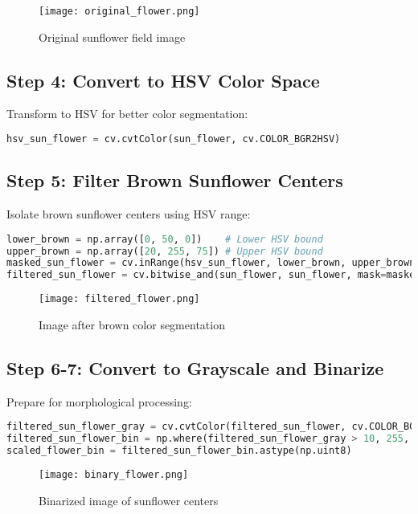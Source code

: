 \documentclass[12pt]{article}
\begin{document}
\begin{figure}[H]
    \centering
    \texttt{[image: original\_flower.png]}
    \caption{Original sunflower field image}
    \label{fig:original}
\end{figure}

\subsection{Step 4: Convert to HSV Color Space}
Transform to HSV for better color segmentation:
\begin{lstlisting}[language=Python]
hsv_sun_flower = cv.cvtColor(sun_flower, cv.COLOR_BGR2HSV)
\end{lstlisting}

\subsection{Step 5: Filter Brown Sunflower Centers}
Isolate brown sunflower centers using HSV range:
\begin{lstlisting}[language=Python]
lower_brown = np.array([0, 50, 0])    # Lower HSV bound
upper_brown = np.array([20, 255, 75]) # Upper HSV bound
masked_sun_flower = cv.inRange(hsv_sun_flower, lower_brown, upper_brown)
filtered_sun_flower = cv.bitwise_and(sun_flower, sun_flower, mask=masked_sun_flower)
\end{lstlisting}

\begin{figure}[H]
    \centering
    \texttt{[image: filtered\_flower.png]}
    \caption{Image after brown color segmentation}
    \label{fig:filtered}
\end{figure}

\subsection{Step 6-7: Convert to Grayscale and Binarize}
Prepare for morphological processing:
\begin{lstlisting}[language=Python]
filtered_sun_flower_gray = cv.cvtColor(filtered_sun_flower, cv.COLOR_BGR2GRAY)
filtered_sun_flower_bin = np.where(filtered_sun_flower_gray > 10, 255, 0)
scaled_flower_bin = filtered_sun_flower_bin.astype(np.uint8)
\end{lstlisting}

\begin{figure}[H]
    \centering
    \texttt{[image: binary\_flower.png]}
    \caption{Binarized image of sunflower centers}
    \label{fig:binary}
\end{figure}
\end{document}
